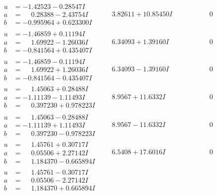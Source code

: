 \documentclass[1p]{elsarticle_modified}
\theoremstyle{definition}
\begin{document}
$$\begin{array}{c|c|c}
\begin{aligned}
u &= -1.42523 - 0.28547 I \\
a &= \phantom{-}0.28388 - 2.43754 I \\
b &= -0.995964 + 0.623300 I\end{aligned}
 & \phantom{-}3.82611 + 10.85450 I & \phantom{-0.000000 } 0 \\ \hline\begin{aligned}
u &= -1.46859 + 0.11194 I \\
a &= \phantom{-}1.69922 - 1.26036 I \\
b &= -0.841564 + 0.435407 I\end{aligned}
 & \phantom{-}6.34093 + 1.39160 I & \phantom{-0.000000 } 0 \\ \hline\begin{aligned}
u &= -1.46859 - 0.11194 I \\
a &= \phantom{-}1.69922 + 1.26036 I \\
b &= -0.841564 - 0.435407 I\end{aligned}
 & \phantom{-}6.34093 - 1.39160 I & \phantom{-0.000000 } 0 \\ \hline\begin{aligned}
u &= \phantom{-}1.45063 + 0.28488 I \\
a &= -1.11139 - 1.11493 I \\
b &= \phantom{-}0.397230 + 0.978223 I\end{aligned}
 & \phantom{-}8.9567 + 11.6332 I & \phantom{-0.000000 } 0 \\ \hline\begin{aligned}
u &= \phantom{-}1.45063 - 0.28488 I \\
a &= -1.11139 + 1.11493 I \\
b &= \phantom{-}0.397230 - 0.978223 I\end{aligned}
 & \phantom{-}8.9567 - 11.6332 I & \phantom{-0.000000 } 0 \\ \hline\begin{aligned}
u &= \phantom{-}1.45761 + 0.30717 I \\
a &= \phantom{-}0.05506 + 2.27142 I \\
b &= \phantom{-}1.184370 - 0.665894 I\end{aligned}
 & \phantom{-}6.5408 + 17.6016 I & \phantom{-0.000000 } 0 \\ \hline\begin{aligned}
u &= \phantom{-}1.45761 - 0.30717 I \\
a &= \phantom{-}0.05506 - 2.27142 I \\
b &= \phantom{-}1.184370 + 0.665894 I\end{aligned}

\end{array}$$
\end{document}

